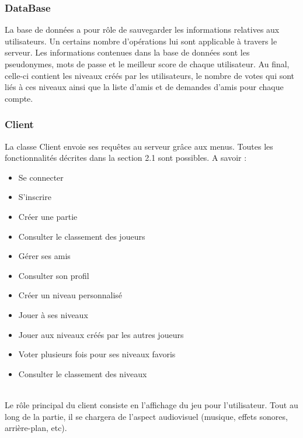 \documentclass[a4paper,12pt]{article}
\begin{document}
\subsubsection{DataBase}

La base de données a pour rôle de sauvegarder les informations relatives aux utilisateurs. Un certains nombre d'opérations lui sont applicable à travers le serveur.
Les informations contenues dans la base de données sont les pseudonymes, mots de passe et le meilleur score de chaque utilisateur. Au final, celle-ci contient les niveaux créés par les utilisateurs, le nombre de votes qui sont liés à ces niveaux ainsi que la liste d'amis et de demandes d'amis pour chaque compte. 

\subsubsection{Client}
La classe Client envoie ses requêtes au serveur grâce aux menus. Toutes les fonctionnalités décrites dans la section 2.1 sont possibles. A savoir : 

\begin{itemize}
    \item Se connecter
    \item S'inscrire
    \item Créer une partie
    \item Consulter le classement des joueurs
    \item Gérer ses amis
    \item Consulter son profil
    \item Créer un niveau personnalisé
    \item Jouer à ses niveaux
    \item Jouer aux niveaux créés par les autres joueurs
    \item Voter plusieurs fois pour ses niveaux favoris
    \item Consulter le classement des niveaux\\\\
\end{itemize}
Le rôle principal du client consiste en l'affichage du jeu pour l'utilisateur. Tout au long de la partie, il se chargera de l'aspect audiovisuel (musique, effets sonores, arrière-plan, etc). 
\end{document}
